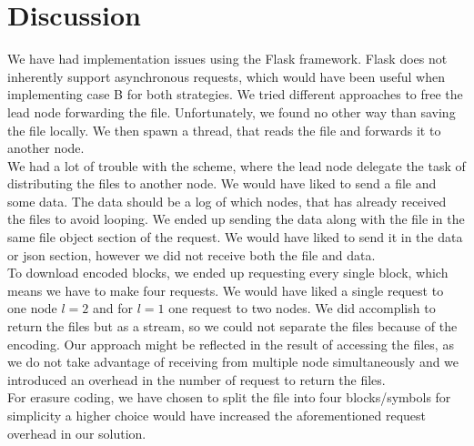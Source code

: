 \section{Discussion} \label{sec:dis}

We have had implementation issues using the Flask framework. 
Flask does not inherently support asynchronous requests, which would have been useful when implementing case B for both strategies. We tried different approaches to free the lead node forwarding the file. Unfortunately, we found no other way than saving the file locally. We then spawn a thread, that reads the file and forwards it to another node.\\
We had a lot of trouble with the scheme, where the lead node delegate the task of distributing the files to another node. We would have liked to send a file and some data. The data should be a log of which nodes, that has already received the files to avoid looping. We ended up sending the data along with the file in the same file object section of the request. We would have liked to send it in the data or json section, however we did not receive both the file and data. \\
To download encoded blocks, we ended up requesting every single block, which means we have to make four requests. We would have liked a single request to one node $l=2$ and for $l=1$ one request to two nodes. We did accomplish to return the files but as a stream, so we could not separate the files because of the encoding. Our approach might be reflected in the result of accessing the files, as we do not take advantage of receiving from multiple node simultaneously and we introduced an overhead in the number of request to return the files.\\
For erasure coding, we have chosen to split the file into four blocks/symbols for simplicity a higher choice would have increased the aforementioned request overhead in our solution. 